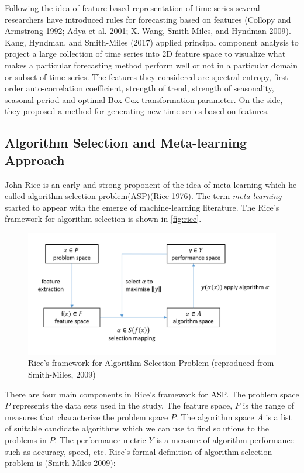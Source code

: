 \documentclass[11pt,]{article}
\theoremstyle{definition}
\theoremstyle{definition}
\theoremstyle{definition}
\theoremstyle{remark}
\begin{document}
Following the idea of feature-based representation of time series
several researchers have introduced rules for forecasting based on
features (Collopy and Armstrong 1992; Adya et al. 2001; X. Wang,
Smith-Miles, and Hyndman 2009). Kang, Hyndman, and Smith-Miles (2017)
applied principal component analysis to project a large collection of
time series into 2D feature space to visualize what makes a particular
forecasting method perform well or not in a particular domain or subset
of time series. The features they considered are spectral entropy,
first-order auto-correlation coefficient, strength of trend, strength of
seasonality, seasonal period and optimal Box-Cox transformation
parameter. On the side, they proposed a method for generating new time
series based on features.

\subsection{Algorithm Selection and Meta-learning
Approach}\label{algorithm-selection-and-meta-learning-approach}

John Rice is an early and strong proponent of the idea of meta learning
which he called algorithm selection problem(ASP)(Rice 1976). The term
\emph{meta-learning} started to appear with the emerge of
machine-learning literature. The Rice's framework for algorithm
selection is shown in \autoref{fig:rice}.

\begin{figure}

{\centering \includegraphics[width=\textwidth]{figures/RiceFramework} 

}

\caption{Rice's framework for Algorithm Selection Problem (reproduced from Smith-Miles, 2009)}\label{fig:rice}
\end{figure}

There are four main components in Rice's framework for ASP. The problem
space \(P\) represents the data sets used in the study. The feature
space, \(F\) is the range of measures that characterize the problem
space \(P\). The algorithm space \(A\) is a list of suitable candidate
algorithms which we can use to find solutions to the problems in \(P\).
The performance metric \(Y\) is a measure of algorithm performance such
as accuracy, speed, etc. Rice's formal definition of algorithm selection
problem is (Smith-Miles 2009):
\end{document}
